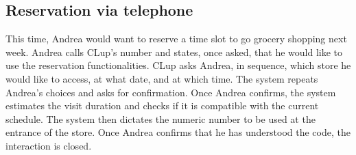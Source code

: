 \documentclass[../../main.tex]{subfiles}
\begin{document}
    \subsection{Reservation via telephone}

    This time, Andrea would want to reserve a time slot to go grocery shopping next week. 
    Andrea calls CLup's number and states, once asked, that he would like to use the reservation functionalities. 
    CLup asks Andrea, in sequence, which store he would like to access, at what date, and at which time. 
    The system repeats Andrea's choices and asks for confirmation. Once Andrea confirms, 
    the system estimates the visit duration and checks if it is compatible with the current schedule. 
    The system then dictates the numeric number to be used at the entrance of the store. 
    Once Andrea confirms that he has understood the code, the interaction is closed.
\end{document}
